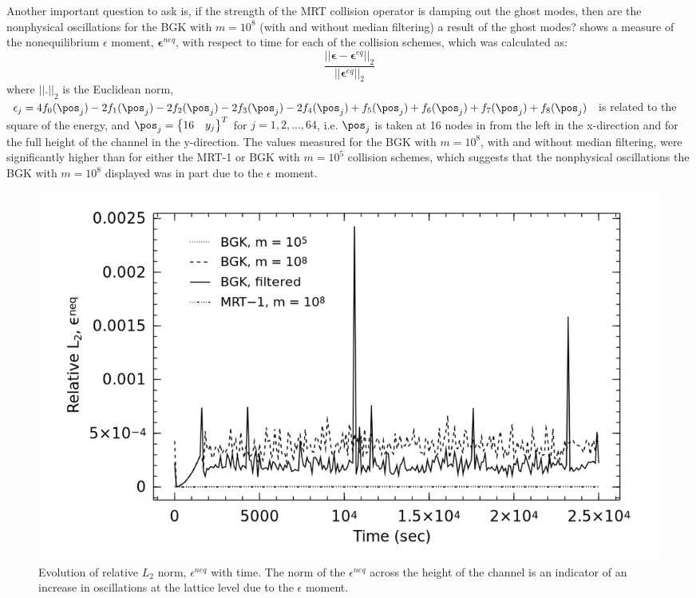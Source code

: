 Another important question to ask is, if the strength of the MRT collision operator is damping out the ghost modes, then are the nonphysical oscillations for the BGK with $m = 10^8$ (with and without median filtering) a result of the ghost modes?
 shows a measure of the nonequilibrium $\epsilon$ moment, $\boldsymbol{\epsilon}^{neq}$, with respect to time for each of the collision schemes, which was calculated as:
\begin{equation}
\frac{||\boldsymbol{\epsilon} - \boldsymbol{\epsilon}^{eq}||_2}{||\boldsymbol{\epsilon}^{eq}||_2}
\end{equation}
\noindent where $||.||_2$ is the Euclidean norm, $\epsilon_j = 4f_0(\pos_j) - 2f_1(\pos_j) - 2f_2(\pos_j) - 2f_3(\pos_j) - 2f_4(\pos_j) + f_5(\pos_j) + f_6(\pos_j) + f_7(\pos_j) + f_8(\pos_j)$ is related to the square of the energy, and $\pos_j = \begin{Bmatrix}16 & y_j\end{Bmatrix}^T$ for $j = 1, 2, ..., 64$, i.e. $\pos_j$ is taken at 16 nodes in from the left in the x-direction and for the full height of the channel in the y-direction.
The values measured for the BGK with $m = 10^8$, with and without median filtering, were significantly higher than for either the MRT-1 or BGK with $m = 10^5$ collision schemes, which suggests that the nonphysical oscillations the BGK with $m = 10^8$ displayed was in part due to the $\epsilon$ moment.

\begin{figure}
	\centering
    \includegraphics[width=\linewidth]{figs/poise-bingham/epsilon}
    \caption{Evolution of relative $L_2$ norm, $\epsilon^{neq}$ with time. The norm of the $\epsilon^{neq}$ across the height of the channel is an indicator of an increase in oscillations at the lattice level due to the $\epsilon$ moment.}
    \label{fig:epsilon}
\end{figure}

